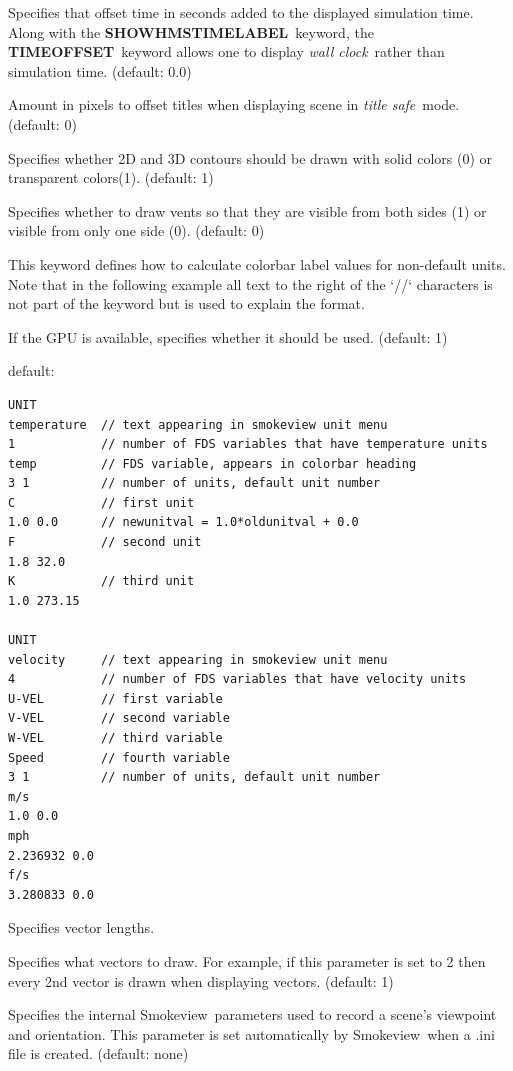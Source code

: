 \documentclass[11pt,twoside]{book}
\newcommand{\smokeview}{{Smokeview}}
\newcommand{\hitem}[1]{\item[{\bf #1} \hfill]}
\begin{document}
\hitem{TIMEOFFSET} Specifies that offset time in seconds added to
the displayed simulation time.  Along with the {\bf
SHOWHMSTIMELABEL}\ keyword, the {\bf TIMEOFFSET}\ keyword allows
one to display {\em wall clock}\ rather than simulation time.
(default: 0.0)

\hitem{TITLESAFE}Amount in pixels to offset titles when displaying
scene in {\em title safe}\ mode.   (default: 0)

\hitem{TRANSPARENT}Specifies whether 2D and 3D contours should be
drawn with solid colors (0) or transparent colors(1). (default: 1)

\hitem{TWOSIDEDVENTS}  Specifies whether to draw vents so that they are visible from
both sides (1) or visible from only one side (0).  (default: 0)

\hitem{UNIT}This keyword defines how to calculate colorbar label
values for non-default units.  Note that in the following example
all text to the right of the `//` characters is not part of the
keyword but is used to explain the format.

\hitem{USEGPU} If the GPU is available, specifies whether it should be used. (default: 1)

default:
{\small
\begin{verbatim}
UNIT
temperature  // text appearing in smokeview unit menu
1            // number of FDS variables that have temperature units
temp         // FDS variable, appears in colorbar heading
3 1          // number of units, default unit number
C            // first unit
1.0 0.0      // newunitval = 1.0*oldunitval + 0.0
F            // second unit
1.8 32.0
K            // third unit
1.0 273.15

UNIT
velocity     // text appearing in smokeview unit menu
4            // number of FDS variables that have velocity units
U-VEL        // first variable
V-VEL        // second variable
W-VEL        // third variable
Speed        // fourth variable
3 1          // number of units, default unit number
m/s
1.0 0.0
mph
2.236932 0.0
f/s
3.280833 0.0
\end{verbatim}
}

\hitem{VECLENGTH} Specifies vector lengths.

\hitem{VECTORSKIP}Specifies
what vectors to draw.  For example, if this parameter is set to 2 then
every 2nd vector is drawn when displaying vectors.
(default: 1)

\hitem{VIEWPOINT}Specifies the internal \smokeview\ parameters used to
record a scene's viewpoint and orientation.  This parameter is set automatically
by \smokeview\ when a .ini file is created.
(default: none)
\end{document}
